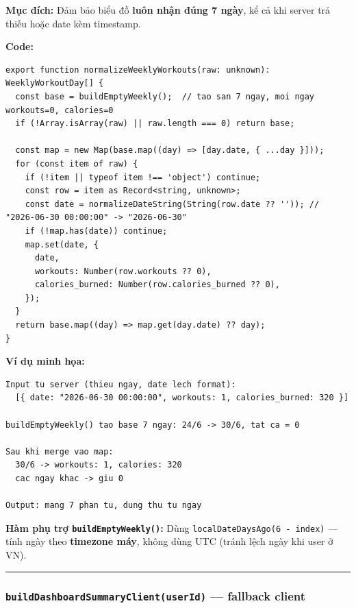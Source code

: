 \documentclass[12pt,a4paper]{article}
\providecommand{\passthrough}[1]{#1}
\begin{document}
\textbf{Mục đích:} Đảm bảo biểu đồ \textbf{luôn nhận đúng 7 ngày}, kể cả
khi server trả thiếu hoặc date kèm timestamp.

\textbf{Code:}

\begin{lstlisting}
export function normalizeWeeklyWorkouts(raw: unknown): WeeklyWorkoutDay[] {
  const base = buildEmptyWeekly();  // tao san 7 ngay, moi ngay workouts=0, calories=0
  if (!Array.isArray(raw) || raw.length === 0) return base;

  const map = new Map(base.map((day) => [day.date, { ...day }]));
  for (const item of raw) {
    if (!item || typeof item !== 'object') continue;
    const row = item as Record<string, unknown>;
    const date = normalizeDateString(String(row.date ?? '')); // "2026-06-30 00:00:00" -> "2026-06-30"
    if (!map.has(date)) continue;
    map.set(date, {
      date,
      workouts: Number(row.workouts ?? 0),
      calories_burned: Number(row.calories_burned ?? 0),
    });
  }
  return base.map((day) => map.get(day.date) ?? day);
}

\end{lstlisting}

\textbf{Ví dụ minh họa:}

\begin{lstlisting}
Input tu server (thieu ngay, date lech format):
  [{ date: "2026-06-30 00:00:00", workouts: 1, calories_burned: 320 }]

buildEmptyWeekly() tao base 7 ngay: 24/6 -> 30/6, tat ca = 0

Sau khi merge vao map:
  30/6 -> workouts: 1, calories: 320
  cac ngay khac -> giu 0

Output: mang 7 phan tu, dung thu tu ngay
\end{lstlisting}

\textbf{Hàm phụ trợ \passthrough{\lstinline!buildEmptyWeekly()!}:} Dùng
\passthrough{\lstinline!localDateDaysAgo(6 - index)!} --- tính ngày theo
\textbf{timezone máy}, không dùng UTC (tránh lệch ngày khi user ở VN).

\begin{center}\rule{0.5\linewidth}{0.5pt}\end{center}

\subsubsection{\texorpdfstring{\texttt{buildDashboardSummaryClient(userId)}
--- fallback
client}{buildDashboardSummaryClient(userId) --- fallback client}}\label{builddashboardsummaryclientuserid-fallback-client}
\end{document}
